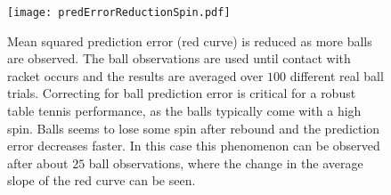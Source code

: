 %
\begin{figure}
	\centering
	\texttt{[image: predErrorReductionSpin.pdf]}
	\caption{Mean squared prediction error (red curve) is reduced as more balls are observed. The ball observations are used until contact with racket occurs and the results are averaged over $100$ different real ball trials. Correcting for ball prediction error is critical for a robust table tennis performance, as the balls typically come with a high spin. Balls seems to lose some spin after rebound and the prediction error decreases faster. In this case this phenomenon can be observed after about $25$ ball observations, where the change in the average slope of the red curve can be seen.}
	\label{predErrorReduction}
\end{figure}
%
%
%
%
%
